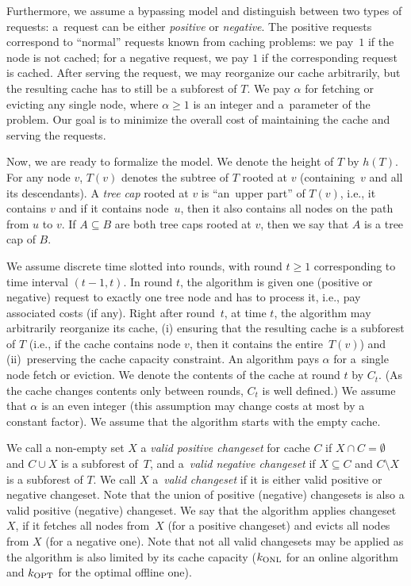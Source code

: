 Furthermore, we assume a bypassing model and distinguish between two types of
requests: a~request can be either \emph{positive} or \emph{negative}. The
positive requests correspond to ``normal'' requests known from caching
problems: we pay~$1$ if the node is not cached; for a negative request, we pay
$1$ if the corresponding request is cached. After serving the request, we may
reorganize our cache arbitrarily, but the resulting cache has to still be a
subforest of $T$. We pay $\alpha$ for fetching or evicting any single node,
where $\alpha \geq 1$ is an integer and a~parameter of the problem. Our goal
is to minimize the overall cost of maintaining the cache and serving the
requests.

Now, we are ready to formalize the model.
We denote the height of $T$ by $h(T)$. For any node $v$, $T(v)$ denotes the
subtree of $T$ rooted at $v$ (containing~$v$ and all its descendants). A
\emph{tree cap} rooted at $v$ is ``an~upper part'' of $T(v)$, i.e., it
contains $v$ and if it contains node~$u$, then it also contains all nodes on
the path from $u$ to $v$. If $A \subseteq B$ are both tree caps rooted at $v$,
then we say that $A$ is a tree cap of $B$.

We assume discrete time slotted into rounds, with round $t \geq 1$
corresponding to time interval $(t-1,t)$. In round $t$, the algorithm is given
one (positive or negative) request to exactly one tree node and has to process
it, i.e., pay associated costs (if any). Right after round~$t$, at time $t$,
the algorithm may arbitrarily reorganize its cache, (i) ensuring that the
resulting cache is a subforest of $T$ (i.e., if the cache contains node $v$,
then it contains the entire~$T(v)$) and (ii)~preserving the cache capacity
constraint. An algorithm pays $\alpha$ for a~single node fetch or eviction. We
denote the contents of the cache at round $t$ by $C_t$. (As the cache changes
contents only between rounds, $C_t$ is well defined.) We assume that $\alpha$
is an even integer (this assumption may change costs at most by a constant
factor). We assume that the algorithm starts with the empty cache.

We call a non-empty set $X$ a \emph{valid positive changeset} for cache $C$ if
$X \cap C = \emptyset$ and $C \cup X$ is a subforest of~$T$, and a~\emph{valid
negative changeset} if $X \subseteq C$ and $C \setminus X$ is a subforest of
$T$. We call $X$ a~\emph{valid changeset} if it is either valid positive or
negative changeset. Note that the union of positive (negative) changesets is
also a valid positive (negative) changeset. We say that the algorithm applies
changeset~$X$, if it fetches all nodes from~$X$ (for a positive changeset) and
evicts all nodes from $X$ (for a negative one). Note that not all valid
changesets may be applied as the algorithm is also limited by its cache capacity
($k_\textnormal{ONL}$ for an online algorithm and $k_\textnormal{OPT}$ for the optimal offline one).

